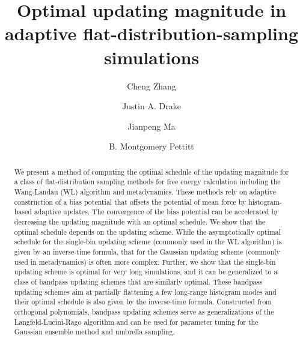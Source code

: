 \documentclass[reprint, superscriptaddress, floatfix]{revtex4-1}
\begin{document}
\title{Optimal updating magnitude in adaptive flat-distribution-sampling simulations}

\author{Cheng Zhang}
\author{Justin A. Drake}
\author{Jianpeng Ma}
\author{B. Montgomery Pettitt}



\begin{abstract}
  We present a method of computing the optimal schedule
  of the updating magnitude
  for a class of flat-distribution sampling methods
  for free energy calculation including
  the Wang-Landau (WL) algorithm and metadynamics.
  These methods rely on adaptive construction of
  a bias potential that offsets
  the potential of mean force by histogram-based adaptive updates.
  The convergence of the bias potential can be accelerated
  by decreasing the updating magnitude with an optimal schedule.
  We show that
  the optimal schedule depends on the updating scheme.
  While the asymptotically optimal schedule for
  the single-bin updating scheme (commonly used in the WL algorithm)
  is given by an inverse-time formula,
  that for the Gaussian updating scheme (commonly used in metadynamics)
  is often more complex.
  Further,
  we show that the single-bin updating scheme
  is optimal for very long simulations,
  and it can be generalized to a class of bandpass updating schemes
  that are similarly optimal.
  These bandpass updating schemes aim at
  partially flattening a few long-range histogram modes
  and their optimal schedule
  is also given by the inverse-time formula.
  Constructed from orthogonal polynomials,
  bandpass updating schemes serve as generalizations
  of the Langfeld-Lucini-Rago algorithm
  and can be used for parameter tuning for the Gaussian ensemble method
  and umbrella sampling.
\end{abstract}

\maketitle
\end{document}
